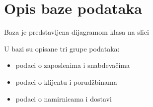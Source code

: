 \section{\bfseries Opis baze podataka}
Baza je predstavljena dijagramom klasa na slici %

U bazi su opisane tri grupe podataka:
\begin{itemize}
    \item podaci o zaposlenima i snabdevačima
    \item podaci o klijentu i porudžbinama
    \item podaci o namirnicama i dostavi
\end{itemize}





